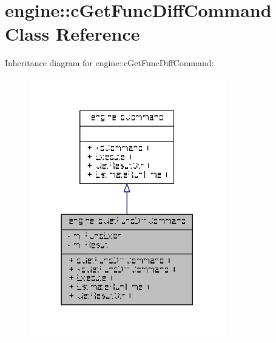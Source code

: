 \hypertarget{classengine_1_1cGetFuncDiffCommand}{\section{engine\-:\-:c\-Get\-Func\-Diff\-Command Class Reference}
\label{classengine_1_1cGetFuncDiffCommand}
}


Inheritance diagram for engine\-:\-:c\-Get\-Func\-Diff\-Command\-:
\nopagebreak
\begin{figure}[H]
\begin{center}
\leavevmode
\includegraphics[width=242pt]{classengine_1_1cGetFuncDiffCommand__inherit__graph}
\end{center}
\end{figure}


